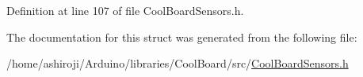 Definition at line 107 of file Cool\+Board\+Sensors.\+h.



The documentation for this struct was generated from the following file\+:\begin{DoxyCompactItemize}
\item 
/home/ashiroji/\+Arduino/libraries/\+Cool\+Board/src/\hyperlink{_cool_board_sensors_8h}{Cool\+Board\+Sensors.\+h}\end{DoxyCompactItemize}
